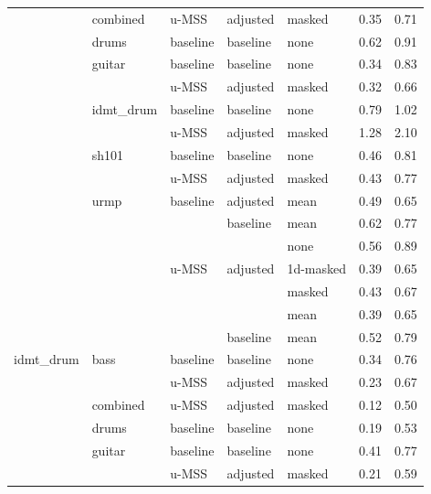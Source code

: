 \begin{theappendices}
\begin{longtable}{lllllrr}
     & combined & u-MSS & adjusted & masked &            0.35 &                  0.71 \\
     & drums & baseline & baseline & none &            0.62 &                  0.91 \\
     & guitar & baseline & baseline & none &            0.34 &                  0.83 \\
     &      & u-MSS & adjusted & masked &            0.32 &                  0.66 \\
     & idmt\_drum & baseline & baseline & none &            0.79 &                  1.02 \\
     &      & u-MSS & adjusted & masked &            1.28 &                  2.10 \\
     & sh101 & baseline & baseline & none &            0.46 &                  0.81 \\
     &      & u-MSS & adjusted & masked &            0.43 &                  0.77 \\
     & urmp & baseline & adjusted & mean &            0.49 &                  0.65 \\
     &      &       & baseline & mean &            0.62 &                  0.77 \\
     &      &       &          & none &            0.56 &                  0.89 \\
     &      & u-MSS & adjusted & 1d-masked &            0.39 &                  0.65 \\
     &      &       &          & masked &            0.43 &                  0.67 \\
     &      &       &          & mean &            0.39 &                  0.65 \\
     &      &       & baseline & mean &            0.52 &                  0.79 \\
idmt\_drum & bass & baseline & baseline & none &            0.34 &                  0.76 \\
     &      & u-MSS & adjusted & masked &            0.23 &                  0.67 \\
     & combined & u-MSS & adjusted & masked &            0.12 &                  0.50 \\
     & drums & baseline & baseline & none &            0.19 &                  0.53 \\
     & guitar & baseline & baseline & none &            0.41 &                  0.77 \\
     &      & u-MSS & adjusted & masked &            0.21 &                  0.59 \\

\end{longtable}
\end{theappendices}
